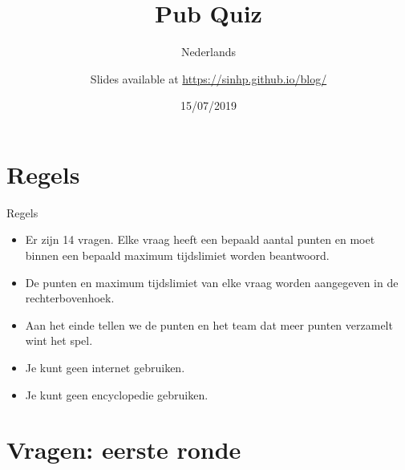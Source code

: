 \documentclass[10pt]{beamer}
\title{Pub Quiz}
\subtitle{Nederlands}
\date{15/07/2019}
\date{}
\author{Slides available at \url{https://sinhp.github.io/blog/}}
\institute{Dizzy}
\begin{document}
\maketitle


\section{Regels}

\begin{frame}[fragile]{Regels}
    \begin{itemize}
        \item Er zijn 14 vragen. Elke vraag heeft een bepaald aantal punten en moet binnen een bepaald maximum tijdslimiet worden beantwoord.
        \item De punten en maximum tijdslimiet van elke vraag worden aangegeven in de rechterbovenhoek. 
        \item Aan het einde tellen we de punten en het team dat meer punten verzamelt wint het spel.
        \item Je kunt geen internet gebruiken.
        \item Je kunt geen encyclopedie gebruiken.
    \end{itemize}
\end{frame}


\section{Vragen: eerste ronde}
\end{document}
